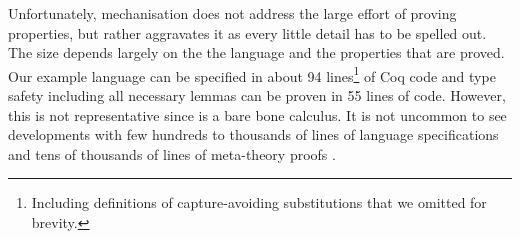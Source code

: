 {%

Unfortunately, mechanisation does not address the large effort of proving
properties, but rather aggravates it as every little detail has to be spelled
out. The size depends largely on the the language and the properties that are
proved. Our example language \stlcbool can be specified in about 94
lines\footnote{Including definitions of capture-avoiding substitutions that we
  omitted for brevity.} of Coq code and type safety including all necessary
lemmas can be proven in 55 lines of code. However, this is not representative
since \stlcbool is a bare bone calculus. It is not uncommon to see developments
with few hundreds to thousands of lines of language specifications and tens of
thousands of lines of meta-theory proofs \cite{Leroy2009, Zhao2010}.


}
